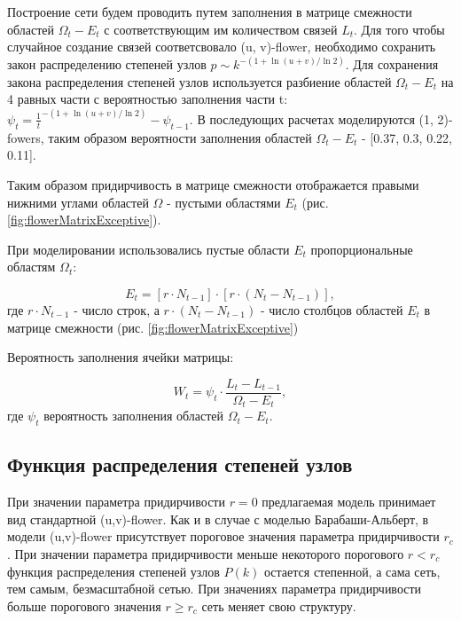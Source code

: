 \documentclass[10pt,aps,pra]{revtex4-1}
\begin{document}
        Построение сети будем проводить путем заполнения в матрице смежности областей $\Omega_t - E_t$ с соответствующим им количеством связей $L_t$. Для того чтобы случайное создание связей соответсвовало (u, v)-flower, необходимо сохранить закон распределению степеней узлов $p \sim k^{-(1+\ln(u+v)/\ln{2})}$\cite{Rozenfeld2}. Для сохранения закона распределения степеней узлов используется разбиение областей $\Omega_t-E_t$ на 4 равных части с вероятностью заполнения части t: $\psi_t =  \frac{1}{t}^{-(1+\ln(u+v)/\ln{2})} - \psi_{t-1}$. В последующих расчетах моделируются (1, 2)-fowers, таким образом вероятности заполнения областей $\Omega_t-E_t$ - [0.37, 0.3, 0.22, 0.11].


        Таким образом придирчивость в матрице смежности отображается правыми нижними углами областей $\Omega$ - пустыми областями $E_t$ (рис. \ref{fig:flowerMatrixExceptive}). 
        
        При моделировании использовались пустые области $E_t$ пропорциональные областям $\Omega_t$:

            \begin{equation}
                E_t= [r \cdot N_{t-1}] \cdot [r \cdot (N_t - N_{t-1})],
            \end{equation}
                где $r \cdot N_{t-1}$ - число строк, а $r \cdot (N_t - N_{t-1})$ - число столбцов областей $E_t$ в матрице смежности (рис. \ref{fig:flowerMatrixExceptive})

        Вероятность заполнения ячейки матрицы:
        
            \begin{equation}
                W_t=\psi_t \cdot \frac{L_t-L_{t-1}}{\Omega_t-E_t},
            \end{equation}
                где $\psi_t$ вероятность заполнения областей $\Omega_t - E_t$.

    \subsection{Функция распределения степеней узлов}

        При значении параметра придирчивости $r=0$ предлагаемая модель принимает вид стандартной (u,v)-flower. Как и в случае с моделью Барабаши-Альберт, в модели (u,v)-flower присутствует пороговое значения параметра придирчивости $r_c$. При значении параметра придирчивости меньше некоторого порогового $r<r_c$ функция распределения степеней узлов $P(k)$ остается степенной, а сама сеть, тем самым, безмасштабной сетью. При значениях параметра придирчивости больше порогового значения $r \geq r_c$ сеть меняет свою структуру. 
\end{document}

